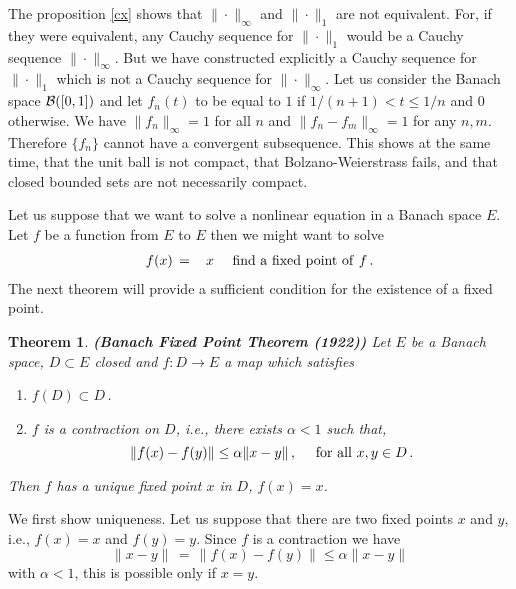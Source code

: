 \documentclass[12pt]{report}
\newcommand{\calB}{{\cal B}}
\newtheorem{theorem}{Theorem}[section]
\newcommand{\proof}{\noindent {\em Proof:~}}
\def\to{\rightarrow}
\begin{document}
The proposition \ref{cx} shows that $\| \cdot\|_\infty$ and $\|\cdot
\|_1$ are not equivalent. For, if they were equivalent, any Cauchy
sequence for $\| \cdot\|_1$ would be a Cauchy sequence $\|\cdot
\|_\infty$. But we have constructed explicitly a Cauchy sequence for
$\| \cdot\|_1$ which is not a Cauchy sequence for $\|\cdot
\|_\infty$.  Let us consider the Banach space $\calB([0,1])$ and let
$f_n(t)$ to be equal to $1$ if $ 1/(n+1) < t \le 1/n$ and $0$
otherwise.  We have $\|f_n\|_\infty =1$ for all $n$ and $\| f_n - f_m
\|_\infty =1$ for any $n,m$. Therefore $\{f_n\}$ cannot have a
convergent subsequence. This shows at the same time, that the unit
ball is not compact, that Bolzano-Weierstrass fails, and that closed
bounded sets are not necessarily compact. 


Let us suppose that we want to solve a nonlinear equation in a Banach
space $E$. Let $f$ be a function from $E$ to $E$ then we might want to
solve
\begin{eqnarray}
f(x)\,&=&\, x\,\, \quad {\rm find~a~fixed~point~of~}f \,.
\end{eqnarray}
The next theorem will provide a sufficient condition for the
existence of a fixed point.

\begin{theorem} {\bf (Banach Fixed Point Theorem (1922))}  Let $E$ be a Banach 
space, 
$D \subset E$ closed and $f : D \to E$ a map which satisfies
\begin{enumerate}
\item $f(D) \subset D$\,. 
\item $f$ is a contraction on $D$, i.e., there exists $\alpha < 1$ such that, 
\begin{equation}
\|f(x) - f(y) \| \le \alpha \|x-y\|\,, \quad {\rm ~for~all~} x,y \in D\,.
\end{equation}
\end{enumerate}
Then $f$ has a unique fixed point $x$ in $D$,  $f(x)=x$. 
\end{theorem}

\proof We first show uniqueness. Let us suppose that there are two
fixed points $x$ and $y$, i.e., $f(x)=x$ and $f(y)=y$. Since $f$ is a 
contraction we have
\begin{equation}
\|x - y \| \,=\, \| f(x) - f(y) \| \le \alpha \|x - y\| 
\end{equation}
with $\alpha < 1$, this is possible only if $x=y$. 
\end{document}
